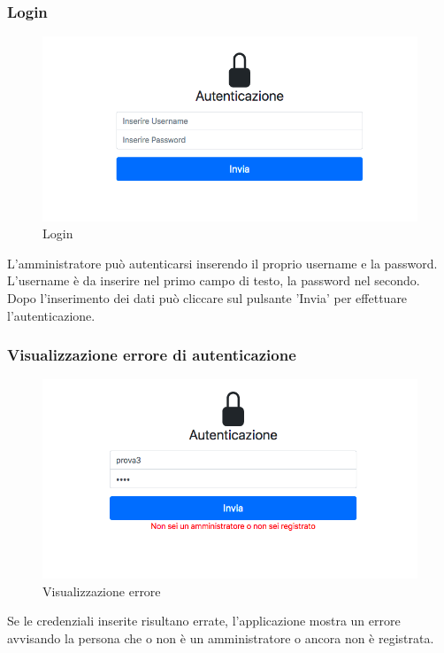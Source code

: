 \subsubsection{Login}
\begin{figure}[H]
	\centering
	\includegraphics[width=15cm]{res/images/login.jpg}
	\caption{Login}
\end{figure}
L'amministratore può autenticarsi inserendo il proprio username e la password. L’username è da inserire nel primo campo di testo, la password nel secondo. Dopo l’inserimento dei dati può cliccare sul pulsante 'Invia' per effettuare l'autenticazione.

\subsubsection{Visualizzazione errore di autenticazione}
\begin{figure}[H]
	\centering
	\includegraphics[width=15cm]{res/images/error.png}
	\caption{Visualizzazione errore}
\end{figure}
Se le credenziali inserite risultano errate, l’applicazione mostra un errore avvisando la persona che o non è un amministratore o ancora non è registrata.

